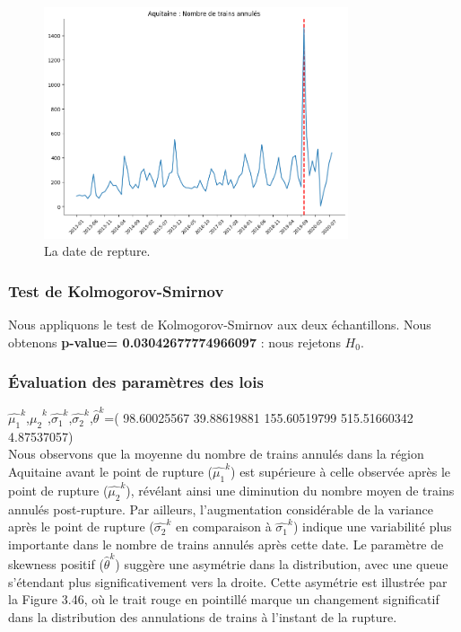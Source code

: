 {\begin{figure}[H]
\centering
\includegraphics[width=0.8\textwidth]{image/AQ-FIG10.png} 
\caption{La date de repture.}
\label{fig:trains_ANNULES_2}
\end{figure}




\subsubsection{Test de Kolmogorov-Smirnov}

Nous appliquons le test de Kolmogorov-Smirnov aux deux échantillons. Nous obtenons \textbf{p-value= 0.03042677774966097 }: nous rejetons $H_0$.

\subsubsection{Évaluation des paramètres des lois}


$\hat{\mu_1}^k$,$\hat{\mu_2}^k$,$\hat{\sigma_1}^k$,$\hat{\sigma_2}^k$,$\hat{\theta}^k$=( 98.60025567  39.88619881 155.60519799 515.51660342   4.87537057)\\

Nous observons que la moyenne du nombre de trains annulés dans la région Aquitaine avant le point de rupture ($\hat{\mu_1}^k$) est supérieure à celle observée après le point de rupture ($\hat{\mu_2}^k$), révélant ainsi une diminution du nombre moyen de trains annulés post-rupture. Par ailleurs, l'augmentation considérable de la variance après le point de rupture ($\hat{\sigma_2}^k$ en comparaison à $\hat{\sigma_1}^k$) indique une variabilité plus importante dans le nombre de trains annulés après cette date. Le paramètre de skewness positif ($\hat{\theta}^k$) suggère une asymétrie dans la distribution, avec une queue s'étendant plus significativement vers la droite. Cette asymétrie est illustrée par la Figure 3.46, où le trait rouge en pointillé marque un changement significatif dans la distribution des annulations de trains à l'instant de la rupture.


}
